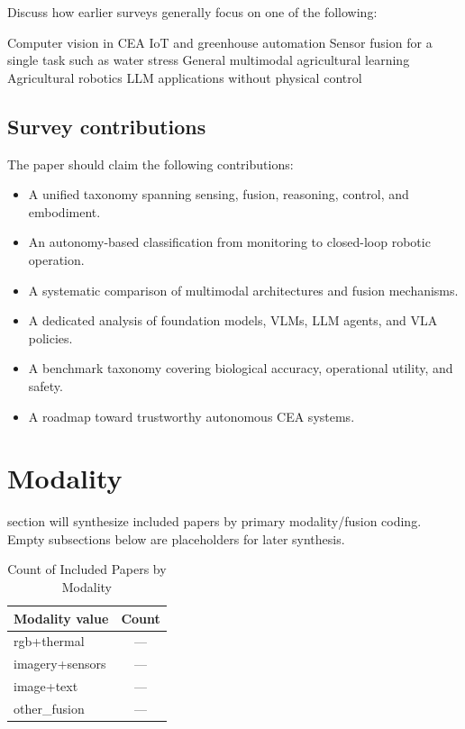\documentclass[lettersize,journal]{IEEEtran}
\begin{document}
Discuss how earlier surveys generally focus on one of the following:

Computer vision in CEA
IoT and greenhouse automation
Sensor fusion for a single task such as water stress
General multimodal agricultural learning
Agricultural robotics
LLM applications without physical control
\subsection{Survey contributions}

The paper should claim the following contributions:

\begin{itemize}
    \item A unified taxonomy spanning sensing, fusion, reasoning, control, and embodiment.
\item An autonomy-based classification from monitoring to closed-loop robotic operation.
\item A systematic comparison of multimodal architectures and fusion mechanisms.
\item A dedicated analysis of foundation models, VLMs, LLM agents, and VLA policies.
\item A benchmark taxonomy covering biological accuracy, operational utility, and safety.
\item A roadmap toward trustworthy autonomous CEA systems.
\end{itemize}







\newpage



\section{Modality}
 section will synthesize included papers by primary modality/fusion coding.
Empty subsections below are placeholders for later synthesis.

\begin{table}[H]
\caption{Count of Included Papers by Modality}
\label{tab:modality_counts}
\centering
\begin{tabular}{|l|c|}
\hline
Modality value & Count\\
\hline
rgb+thermal & ---\\
imagery+sensors & ---\\
image+text & ---\\
other\_fusion & ---\\
\hline
\end{tabular}
\end{table}
\end{document}

